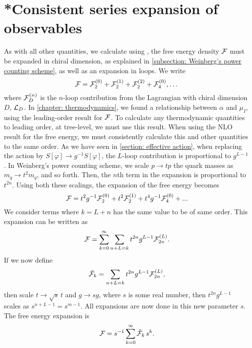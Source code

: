 \section{*Consistent series expansion of observables}
\label{appendix: consisten expansion}

As with all other quantities, we calculate using \chpt, the free energy density $\mathcal{F}$ must be expanded in chiral dimension, as explained in \autoref{subsection: Weinberg's power counting scheme}, as well as an expansion in loops.
We write
%
\begin{equation}
    \mathcal{F} = \mathcal{F}^{(0)}_2 + \mathcal{F}^{(1)}_2 + \mathcal{F}^{(2)}_2 + \mathcal{F}^{(0)}_4,\dots
\end{equation}
%
where $\mathcal{F}^{(n)}_D$ is the $n$-loop contribution from the Lagrangian with chiral dimension $D$, $\mathcal{L}_D$.
In \autoref{chapter: thermodynamics}, we found a relationship between $\alpha$ and $\mu_I$, using the leading-order result for $\mathcal{F}$.
To calculate any thermodynamic quantities to leading order, at tree-level, we must use this result.
When using the NLO result for the free energy, we must consistently calculate this and other quantities to the same order.
As we have seen in \autoref{section: effective action}, when replacing the action by $S[\varphi] \rightarrow g^{-1}S[\varphi]$, the $L$-loop contribution is proportional to $g^{L-1}$.
In Weinberg's power counting scheme, we scale $p \rightarrow t p$ the quark masses as $m_q \rightarrow t^2 m_q$, and so forth.
Then, the $n$th term in the expansion is proportional to $t^{2n}$.
Using both these scalings, the expansion of the free energy becomes
%
\begin{equation}
    \mathcal{F} = t^2 g^{-1} \mathcal{F}_2^{(0)} + t^2 \mathcal{F}_2^{(1)} + t^4 g^{-1} \mathcal{F}_4^{(0)}
    + ...
\end{equation}
%
We consider terms where $k = L + n$ has the same value to be of same order.
This expansion can be written as
\begin{equation}
    \mathcal{F} = \sum_{k=0}^\infty \sum_{n+L=k} t^{2n} g^{L-1} \mathcal{F}_{2n}^{(L)}.
\end{equation}
%
If we now define
\begin{equation}
    \tilde {\mathcal{F}}_k = \sum_{n+L=k} t^{2n} g^{L-1} \mathcal{F}_{2n}^{(L)},
\end{equation}
%
then scale $t \rightarrow \sqrt{s} \, t$ and $g \rightarrow s g$, where $s$ is some real number, then $t^{2n}g^{L-1}$ scales as $s^{n+L-1} = s^{m-1}$.
All expansions are now done in this new parameter $s$.
The free energy expansion is
\begin{equation}
    \mathcal{F} = s^{-1}\sum_{k = 0}^\infty \tilde {\mathcal{F}}_k \, s^{k}.
\end{equation}
